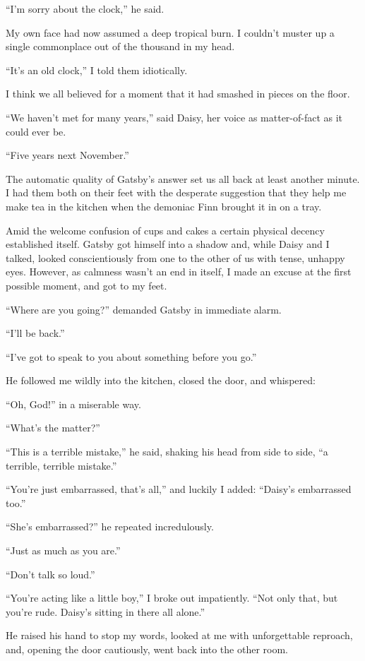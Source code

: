 \documentclass{znotebook}
\begin{document}
``I’m sorry about the clock,'' he said.

My own face had now assumed a deep tropical burn. I couldn’t muster up a single commonplace out of the thousand in my head.

``It’s an old clock,'' I told them idiotically.

I think we all believed for a moment that it had smashed in pieces on the floor.

``We haven’t met for many years,'' said Daisy, her voice as matter-of-fact as it could ever be.

``Five years next November.''

The automatic quality of Gatsby’s answer set us all back at least another minute. I had them both on their feet with the desperate suggestion that they help me make tea in the kitchen when the demoniac Finn brought it in on a tray.

Amid the welcome confusion of cups and cakes a certain physical decency established itself. Gatsby got himself into a shadow and, while Daisy and I talked, looked conscientiously from one to the other of us with tense, unhappy eyes. However, as calmness wasn’t an end in itself, I made an excuse at the first possible moment, and got to my feet.

``Where are you going?'' demanded Gatsby in immediate alarm.

``I’ll be back.''

``I’ve got to speak to you about something before you go.''

He followed me wildly into the kitchen, closed the door, and whispered:

``Oh, God!'' in a miserable way.

``What’s the matter?''

``This is a terrible mistake,'' he said, shaking his head from side to side, ``a terrible, terrible mistake.''

``You’re just embarrassed, that’s all,'' and luckily I added: ``Daisy’s embarrassed too.''

``She’s embarrassed?'' he repeated incredulously.

``Just as much as you are.''

``Don’t talk so loud.''

``You’re acting like a little boy,'' I broke out impatiently. ``Not only that, but you’re rude. Daisy’s sitting in there all alone.''

He raised his hand to stop my words, looked at me with unforgettable reproach, and, opening the door cautiously, went back into the other room.
\end{document}
